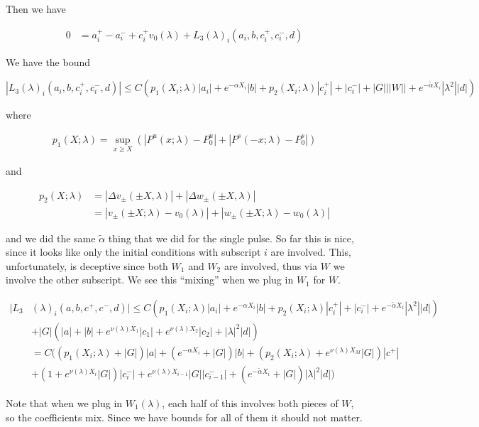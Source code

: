 \documentclass[12pt]{article}
\begin{document}
\begin{enumerate}
Then we have 

\begin{align*}
0 &= a_i^+ - a_i^- + c_i^+ v_0(\lambda) + L_3(\lambda)_i(a_i, b, c_i^+, c_i^-, d)
\end{align*}

We have the bound 

\[
|L_3(\lambda)_i(a_i, b, c_i^+, c_i^-, d)| \leq C ( p_1(X_i; \lambda)|a_i|
+ e^{-\alpha X_i}|b| + p_2(X_i; \lambda)|c_i^+| + |c_i^-| + |G| ||W|| + e^{-\tilde{\alpha} X_i} |\lambda^2| |d| )
\]

where

\begin{align*}
p_1(X;\lambda) = \sup_{x \geq X} (|P^u(x;\lambda) - P_0^u| + |P^s(-x;\lambda) - P_0^s|)
\end{align*}

and

\begin{align*}
p_2(X; \lambda) &= |\Delta v_\pm(\pm X, \lambda)| + |\Delta w_\pm(\pm X, \lambda)|\\
&= |v_\pm(\pm X; \lambda) - v_0(\lambda)| + |w_\pm(\pm X; \lambda) - w_0(\lambda)|
\end{align*}

and we did the same $\tilde{\alpha}$ thing that we did for the single pulse. So far this is nice, since it looks like only the initial conditions with subscript $i$ are involved. This, unfortunately, is deceptive since both $W_1$ and $W_2$ are involved, thus via $W$ we involve the other subscript. We see this ``mixing'' when we plug in $W_1$ for $W$.

\begin{align*}
|L_3&(\lambda)_i(a, b, c^+, c^-, d)| \leq C ( p_1(X_i; \lambda)|a_i|
+ e^{-\alpha X_i}|b| + p_2(X_i; \lambda)|c_i^+| + |c_i^-| + e^{-\tilde{\alpha} X_i} |\lambda^2| |d| ) \\
&+ |G| (|a| + |b| + e^{\nu(\lambda)X_1}|c_1| + e^{\nu(\lambda)X_2}|c_2| + |\lambda|^2 |d| ) \\
&= C( (p_1(X_i; \lambda) + |G|)|a| + (e^{-\alpha X_i} + |G|) |b| + ( p_2(X_i; \lambda) + e^{\nu(\lambda)X_M} |G|) |c^+| \\
&+ (1 + e^{\nu(\lambda)X_i} |G|)|c_i^-| + e^{\nu(\lambda)X_{i-1}} |G||c_{i-1}^-| + (e^{-\tilde{\alpha} X_i} + |G|) |\lambda|^2 |d| )
\end{align*}

Note that when we plug in $W_1(\lambda)$, each half of this involves both pieces of $W$, so the coefficients mix. Since we have bounds for all of them it should not matter.\\ 


\end{enumerate}
\end{document}
